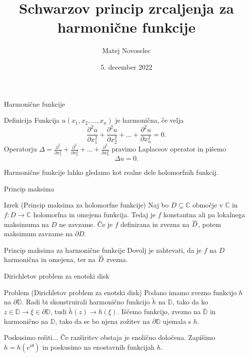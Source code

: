 \documentclass{beamer}
\title{Schwarzov princip zrcaljenja za harmonične funkcije}
\author{Matej Novoselec}
\institute[UL FMF]{FMF Fakulteta za matematiko in fiziko}
\date{5. december 2022}
\newcommand{\overbar}[1]{\mkern 1.5mu\overline{\mkern-1.5mu#1\mkern-1.5mu}\mkern 1.5mu}
\theoremstyle{definition}
\theoremstyle{definition}
\begin{document}
\begin{frame}
   \titlepage
\end{frame}
\begin{frame}{Harmonične funkcije}
   \begin{block}{Definicija}
    Funkcija $u(x_1, x_2, \dots, x_n)$ je harmonična, če velja
    $$
    \frac{\partial^2 u}{\partial x_1 ^ 2} +  \frac{\partial^2 u}{\partial x_2 ^ 2} + \dots + \frac{\partial^2 u}{\partial x_n ^ 2} = 0.
    $$
    Operatorju $\Delta  = \frac{\partial^2}{\partial x_1 ^ 2} +  \frac{\partial^2}{\partial x_2 ^ 2} + \dots + \frac{\partial^2}{\partial x_n ^ 2}$ pravimo Laplaceov operator in pišemo
    $$
    \Delta u = 0.
    $$
   \end{block}
   \pause
   Harmonične funkcije lahko gledamo kot realne dele holomorfnih funkcij.
\end{frame}
\begin{frame}{Princip maksima}
   \begin{alertblock}{Izrek (Princip maksima za holomorfne funkcije)}
      Naj bo $D \subseteq \mathbb{C}$ območje v $\mathbb{C}$ in $f: D \rightarrow \mathbb{C}$ holomorfna in omejena funkcija.
      Tedaj je $f$ konstantna ali pa lokalnega maksimuma na $D$ ne zavzame.      
      \newline
      \pause 
      Če je $f$ definirana in zvezna na $\overbar{D}$, potem maksimum zavzame na $\partial D$.
   \end{alertblock}
   \pause
   \begin{exampleblock}{Princip maksima za harmonične funkcije}
      Dovolj je zahtevati, da je $f$ na $D$ harmonična in omejena, ter na $\overbar{D}$ zvezna. 
   \end{exampleblock}
\end{frame}
\begin{frame}{Dirichletov problem za enotski disk}
   \begin{alertblock}{Problem (Dirichletov problem za enotski disk)}
      Podano imamo zvezno funkcijo $h$ na $\partial \mathbb{D}$. 
      Radi bi skonstruirali harmonično funkcijo $\widetilde{h}$ na $\mathbb{D}$, tako da ko $z \in \mathbb{D} \to \xi \in \partial \mathbb{D} $, tudi $\widetilde{h}(z) \to h(\xi)$.
      \newline
      \pause
      Iščemo funkcijo, zvezno na $\overline{\mathbb{D}}$ in harmonično na $\mathbb{D}$, tako da se bo njena zožitev na $\partial \mathbb{D}$ ujemala s $h$.
   \end{alertblock}
   \begin{exampleblock}{Poskusimo rešiti...}
   \pause
   Če razširitev obstaja je enolično določena.
   \pause
   \newline
   Zapišimo $h = h(e^{i \theta})$ in poskusimo na enostavnih funkcijah $h$.
   \end{exampleblock}
\end{frame}
\end{document}

